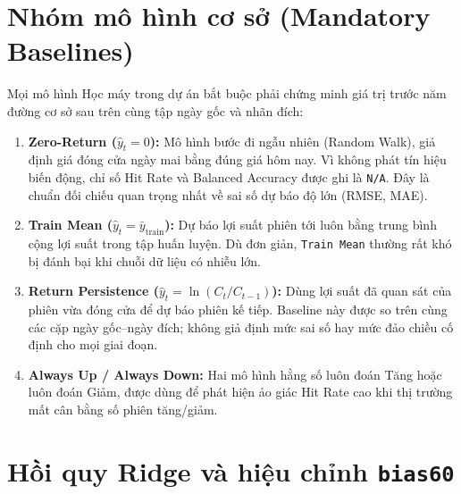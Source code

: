 \documentclass[12pt,a4paper]{report}
\begin{document}
\section{Nhóm mô hình cơ sở (Mandatory Baselines)}
Mọi mô hình Học máy trong dự án bắt buộc phải chứng minh giá trị trước năm đường cơ sở sau trên cùng tập ngày gốc và nhãn đích:
\begin{enumerate}
    \item \textbf{Zero-Return ($\hat{y}_t = 0$):} Mô hình bước đi ngẫu nhiên (Random Walk), giả định giá đóng cửa ngày mai bằng đúng giá hôm nay. Vì không phát tín hiệu biến động, chỉ số Hit Rate và Balanced Accuracy được ghi là \texttt{N/A}. Đây là chuẩn đối chiếu quan trọng nhất về sai số dự báo độ lớn (RMSE, MAE).
    \item \textbf{Train Mean ($\hat{y}_t = \bar{y}_{\text{train}}$):} Dự báo lợi suất phiên tới luôn bằng trung bình cộng lợi suất trong tập huấn luyện. Dù đơn giản, \texttt{Train Mean} thường rất khó bị đánh bại khi chuỗi dữ liệu có nhiễu lớn.
    \item \textbf{Return Persistence ($\hat{y}_t = \ln(C_t/C_{t-1})$):} Dùng lợi suất đã quan sát của phiên vừa đóng cửa để dự báo phiên kế tiếp. Baseline này được so trên cùng các cặp ngày gốc--ngày đích; không giả định mức sai số hay mức đảo chiều cố định cho mọi giai đoạn.
    \item \textbf{Always Up / Always Down:} Hai mô hình hằng số luôn đoán Tăng hoặc luôn đoán Giảm, được dùng để phát hiện ảo giác Hit Rate cao khi thị trường mất cân bằng số phiên tăng/giảm.
\end{enumerate}

\section{Hồi quy Ridge và hiệu chỉnh \texttt{bias60}}
\end{document}
